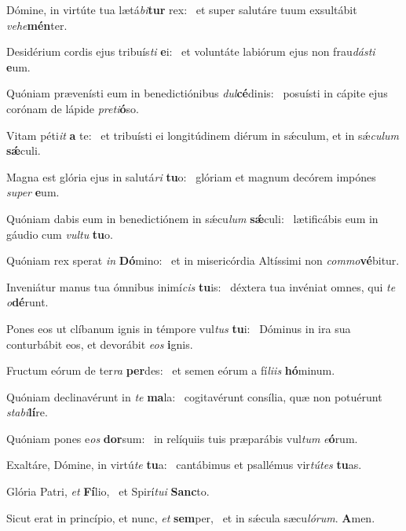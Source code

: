 \item Dómine, in virtúte tua lætá\textit{bi}\textbf{tur} rex:~\psstar{} et super salutáre tuum exsultábit \textit{vehe}\textbf{mén}ter.
\item Desidérium cordis ejus tribuís\textit{ti} \textbf{e}i:~\psstar{} et voluntáte labiórum ejus non frau\textit{dásti} \textbf{e}um.
\item Quóniam prævenísti eum in benedictiónibus \textit{dul}\textbf{cé}dinis:~\psstar{} posuísti in cápite ejus corónam de lápide \textit{preti}\textbf{ó}so.
\item Vitam péti\textit{it} \textbf{a} te:~\psstar{} et tribuísti ei longitúdinem diérum in sǽculum, et in sǽ\textit{culum} \textbf{sǽ}culi.
\item Magna est glória ejus in salutá\textit{ri} \textbf{tu}o:~\psstar{} glóriam et magnum decórem impónes \textit{super} \textbf{e}um.
\item Quóniam dabis eum in benedictiónem in sǽcu\textit{lum} \textbf{sǽ}culi:~\psstar{} lætificábis eum in gáudio cum \textit{vultu} \textbf{tu}o.
\item Quóniam rex sperat \textit{in} \textbf{Dó}mino:~\psstar{} et in misericórdia Altíssimi non \textit{commo}\textbf{vé}bitur.
\item Inveniátur manus tua ómnibus inimí\textit{cis} \textbf{tu}is:~\psstar{} déxtera tua invéniat omnes, qui \textit{te} \textit{o}\textbf{dé}runt.
\item Pones eos ut clíbanum ignis in témpore vul\textit{tus} \textbf{tu}i:~\psstar{} Dóminus in ira sua conturbábit eos, et devorábit \textit{eos} \textbf{i}gnis.
\item Fructum eórum de ter\textit{ra} \textbf{per}des:~\psstar{} et semen eórum a fí\textit{liis} \textbf{hó}minum.
\item Quóniam declinavérunt in \textit{te} \textbf{ma}la:~\psstar{} cogitavérunt consília, quæ non potuérunt \textit{stabi}\textbf{lí}re.
\item Quóniam pones e\textit{os} \textbf{dor}sum:~\psstar{} in relíquiis tuis præparábis vul\textit{tum} \textit{e}\textbf{ó}rum.
\item Exaltáre, Dómine, in virtú\textit{te} \textbf{tu}a:~\psstar{} cantábimus et psallémus vir\textit{tútes} \textbf{tu}as.
\item Glória Patri, \textit{et} \textbf{Fí}lio,~\psstar{} et Spirí\textit{tui} \textbf{Sanc}to.
\item Sicut erat in princípio, et nunc, \textit{et} \textbf{sem}per,~\psstar{} et in sǽcula sæcu\textit{lórum}. \textbf{A}men.